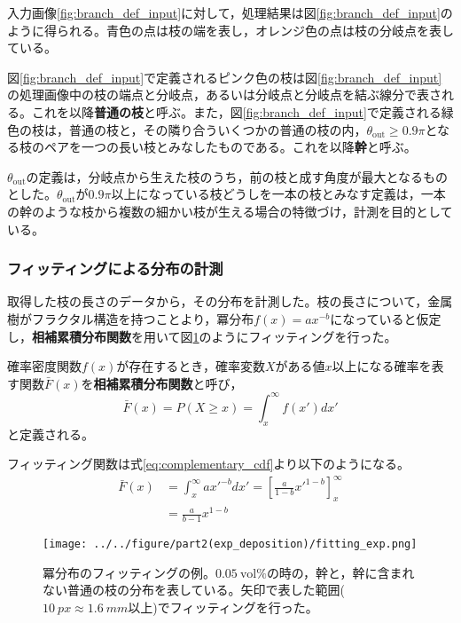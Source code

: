 \documentclass[autodetect-engine,dvi=dvipdfmx,a4paper,ja=standard,oneside,openany,11pt]{bxjsbook}
\begin{document}
入力画像\ref{fig:branch_def_input}に対して，処理結果は図\ref{fig:branch_def_input}のように得られる。青色の点は枝の端を表し，オレンジ色の点は枝の分岐点を表している。

図\ref{fig:branch_def_input}で定義されるピンク色の枝は図\ref{fig:branch_def_input}の処理画像中の枝の端点と分岐点，あるいは分岐点と分岐点を結ぶ線分で表される。これを以降\textbf{普通の枝}と呼ぶ。また，図\ref{fig:branch_def_input}で定義される緑色の枝は，普通の枝と，その隣り合ういくつかの普通の枝の内，$\theta_{\mathrm{out}}\geq 0.9\pi$となる枝のペアを一つの長い枝とみなしたものである。これを以降\textbf{幹}と呼ぶ。

$\theta_{\mathrm{out}}$の定義は，分岐点から生えた枝のうち，前の枝と成す角度が最大となるものとした。$\theta_{\mathrm{out}}$が$0.9\pi$以上になっている枝どうしを一本の枝とみなす定義は，一本の幹のような枝から複数の細かい枝が生える場合の特徴づけ，計測を目的としている。

\subsubsection{フィッティングによる分布の計測}
取得した枝の長さのデータから，その分布を計測した。枝の長さについて，金属樹がフラクタル構造を持つことより，冪分布$f(x)=ax^{-b}$になっていると仮定し，\textbf{相補累積分布関数}を用いて図\ref{fig:fitting_exp}のようにフィッティングを行った。

確率密度関数$f(x)$が存在するとき，確率変数$X$がある値$x$以上になる確率を表す関数$\bar{F}(x)$を\textbf{相補累積分布関数}と呼び，
\begin{equation}
  \bar{F}(x) = P(X \geq x) = \int_{x}^{\infty} f(x')dx'
  \label{eq:complementary_cdf}
\end{equation}
と定義される。

フィッティング関数は式\eqref{eq:complementary_cdf}より以下のようになる。
\begin{equation}
  \begin{split}
    \bar{F}(x) & = \int_{x}^{\infty} ax'^{-b}dx' = \left[ \frac{a}{1-b}x'^{1-b} \right]_{x}^{\infty} \\
               & = \frac{a}{b-1}x^{1-b}
  \end{split}
\end{equation}

\begin{figure}[htbp]
  \centering
  \texttt{[image: ../../figure/part2(exp\_deposition)/fitting\_exp.png]}
  \caption{冪分布のフィッティングの例。$\SI{0.05}{\mathrm{vol}\%}$の時の，幹と，幹に含まれない普通の枝の分布を表している。矢印で表した範囲($\SI{10}{px}\approx\SI{1.6}{mm}$以上)でフィッティングを行った。}
  \label{fig:fitting_exp}
\end{figure}
\end{document}
